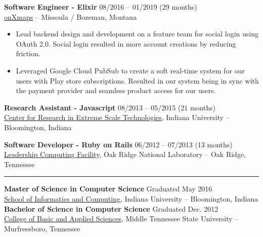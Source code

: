 \documentclass[12pt,letterpaper]{article}
\begin{document}
\noindent\textbf{Software Engineer - Elixir}
\hfill{08/2016 -- 01/2019 (29 months)} \\
\href{https://www.onxmaps.com/}{onXmaps} -- Missoula / Bozeman, Montana

\begin{itemize}

  \item Lead backend design and development on a feature team for social login using OAuth 2.0. Social login resulted in more account creations by reducing friction.

  \item Leveraged Google Cloud PubSub to create a soft real-time system for our users with Play store subscriptions. Resulted in our system being in sync with the payment provider and seamless product access for our users.

\end{itemize}

\noindent\textbf{Research Assistant - Javascript}
\hfill{08/2013 -- 05/2015 (21 months)} \\
\href{https://pti.iu.edu/centers/crest.html}{Center for Research in Extreme Scale Technologies}, Indiana University -- Bloomington, Indiana

\noindent\textbf{Software Developer - Ruby on Rails}
\hfill{06/2012 -- 07/2013 (13 months)} \\
\href{https://www.olcf.ornl.gov/}{Leadership Computing Facility}, Oak Ridge National Laboratory -- Oak Ridge, Tennessee

\noindent\rule{7.5in}{0.4pt}

\noindent\textbf{Master of Science in Computer Science}
\hfill{Graduated May 2016} \\
\href{https://luddy.indiana.edu/}{School of Informatics and Computing}, Indiana University -- Bloomington, Indiana \\

\noindent\textbf{Bachelor of Science in Computer Science}
\hfill{Graduated Dec. 2012} \\
\href{https://www.mtsu.edu/cbas/}{College of Basic and Applied Sciences}, Middle Tennessee State University -- Murfreesboro, Tennessee
\end{document}
